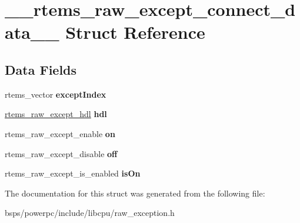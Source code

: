 \hypertarget{struct____rtems__raw__except__connect__data____}{}\section{\+\_\+\+\_\+rtems\+\_\+raw\+\_\+except\+\_\+connect\+\_\+data\+\_\+\+\_\+ Struct Reference}
\label{struct____rtems__raw__except__connect__data____}
\subsection*{Data Fields}
\begin{DoxyCompactItemize}
\item 
\mbox{\label{struct____rtems__raw__except__connect__data_____ac13bd666b630af62c6f034e294e4f12a}} 
rtems\+\_\+vector {\bfseries except\+Index}
\item 
\mbox{\label{struct____rtems__raw__except__connect__data_____a6ee2eb78a9999f3399cee45408843bfb}} 
\mbox{\hyperlink{structrtems__raw__except__hdl}{rtems\+\_\+raw\+\_\+except\+\_\+hdl}} {\bfseries hdl}
\item 
\mbox{\label{struct____rtems__raw__except__connect__data_____adeb69edc1ed37894f73cbffbf7b1c583}} 
rtems\+\_\+raw\+\_\+except\+\_\+enable {\bfseries on}
\item 
\mbox{\label{struct____rtems__raw__except__connect__data_____a1f92f42f9b6de5eb95244d1c6f3ea294}} 
rtems\+\_\+raw\+\_\+except\+\_\+disable {\bfseries off}
\item 
\mbox{\label{struct____rtems__raw__except__connect__data_____ac24c052208d4ae11621308d501fac145}} 
rtems\+\_\+raw\+\_\+except\+\_\+is\+\_\+enabled {\bfseries is\+On}
\end{DoxyCompactItemize}


The documentation for this struct was generated from the following file\+:\begin{DoxyCompactItemize}
\item 
bsps/powerpc/include/libcpu/raw\+\_\+exception.\+h\end{DoxyCompactItemize}
